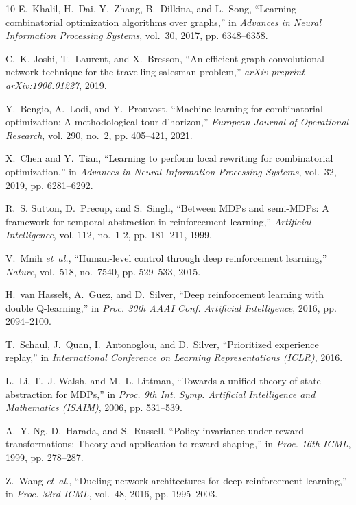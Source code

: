 \documentclass{ieeeaccess}
\begin{document}
{\begin{thebibliography}{10}
E.~Khalil, H.~Dai, Y.~Zhang, B.~Dilkina, and L.~Song, ``Learning combinatorial optimization algorithms over graphs,'' in \emph{Advances in Neural Information Processing Systems}, vol.~30, 2017, pp. 6348--6358.

C.~K. Joshi, T.~Laurent, and X.~Bresson, ``An efficient graph convolutional network technique for the travelling salesman problem,'' \emph{arXiv preprint arXiv:1906.01227}, 2019.

Y.~Bengio, A.~Lodi, and Y.~Prouvost, ``Machine learning for combinatorial optimization: A methodological tour d'horizon,'' \emph{European Journal of Operational Research}, vol. 290, no.~2, pp. 405--421, 2021.

X.~Chen and Y.~Tian, ``Learning to perform local rewriting for combinatorial optimization,'' in \emph{Advances in Neural Information Processing Systems}, vol.~32, 2019, pp. 6281--6292.

R.~S. Sutton, D.~Precup, and S.~Singh, ``Between MDPs and semi-MDPs: A framework for temporal abstraction in reinforcement learning,'' \emph{Artificial Intelligence}, vol. 112, no.~1-2, pp. 181--211, 1999.

V.~Mnih \emph{et~al.}, ``Human-level control through deep reinforcement learning,'' \emph{Nature}, vol.~518, no.~7540, pp. 529--533, 2015.

H.~van Hasselt, A.~Guez, and D.~Silver, ``Deep reinforcement learning with double {Q}-learning,'' in \emph{Proc. 30th AAAI Conf. Artificial Intelligence}, 2016, pp. 2094--2100.

T.~Schaul, J.~Quan, I.~Antonoglou, and D.~Silver, ``Prioritized experience replay,'' in \emph{International Conference on Learning Representations (ICLR)}, 2016.

L.~Li, T.~J. Walsh, and M.~L. Littman, ``Towards a unified theory of state abstraction for {MDPs},'' in \emph{Proc. 9th Int. Symp. Artificial Intelligence and Mathematics (ISAIM)}, 2006, pp. 531--539.

A.~Y. Ng, D.~Harada, and S.~Russell, ``Policy invariance under reward transformations: Theory and application to reward shaping,'' in \emph{Proc. 16th ICML}, 1999, pp. 278--287.

Z.~Wang \emph{et~al.}, ``Dueling network architectures for deep reinforcement learning,'' in \emph{Proc. 33rd ICML}, vol.~48, 2016, pp. 1995--2003.


\end{thebibliography}}
\end{document}
